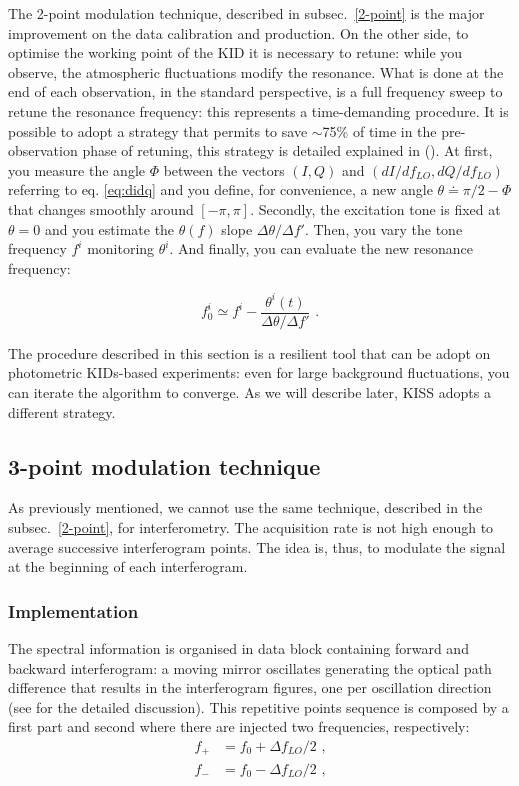 \documentclass[twocolumn,traditabstract]{aa}\\
\begin{document}
The 2-point modulation technique, described in subsec.~\ref{2-point} is the major improvement on the data calibration and production. On the other side, to optimise the working point of the KID it is necessary to retune: while you observe, the atmospheric fluctuations modify the resonance. What is done at the end of each observation, in the standard perspective, is a full frequency sweep to retune the resonance frequency: this represents a time-demanding procedure. It is possible to adopt a strategy that permits to save $\sim$75\% of time in the pre-observation phase of retuning, this strategy is detailed explained in (\cite{2014SPIE.9153E..02C}). At first, you measure the angle $\Phi$ between the vectors $(I,Q)$ and $(dI/df_{LO},dQ/df_{LO})$ referring to eq. \ref{eq:didq} and you define, for convenience, a new angle $\theta\doteq \pi/2-\Phi$ that changes smoothly around $[-\pi,\pi]$. Secondly, the excitation tone is fixed at $\theta=0$ and you estimate the $\theta(f)$ slope $\Delta\theta/\Delta f'$. Then, you vary the tone frequency $f^i$ monitoring $\theta^i$. And finally, you can evaluate the new resonance frequency:

\begin{equation}
f^i_0 \simeq f^i - \frac{\theta^i(t)}{\Delta\theta/\Delta f'} \text{ .}
\end{equation}

The procedure described in this section is a resilient tool that can be adopt on photometric KIDs-based experiments: even for large background fluctuations, you can iterate the algorithm to converge. As we will describe later, KISS adopts a different strategy.

\subsection{3-point modulation technique}

As previously mentioned, we cannot use the same technique, described in the subsec.~\ref{2-point}, for interferometry. The acquisition rate is not high enough to average successive interferogram points. The idea is, thus, to modulate the signal at the beginning of each interferogram.

\subsubsection{Implementation}
The spectral information is organised in data block containing forward and backward interferogram: a moving mirror oscillates generating the optical path difference that results in the interferogram figures, one per oscillation direction (see \cite{fasano-ltd} for the detailed discussion). This repetitive points sequence is composed by a first part and second where there are injected two frequencies, respectively:
\begin{equation}
\begin{align}
f_+ &= f_0 + \Delta f_{LO}/2 	\text{ ,}
\\
f_- &= f_0 - \Delta f_{LO}/2	\text{ ,}
\end{align}
\label{eq:fmod}
\end{equation}
\end{document}
